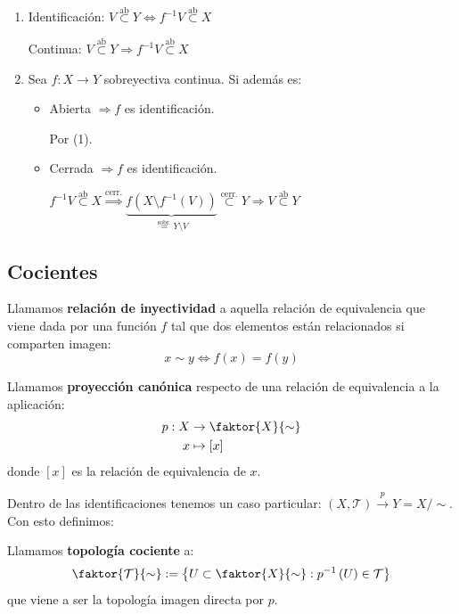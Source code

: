 \begin{obs}
\begin{enumerate}
    \item Identificación: $V \stackrel{\text{ab}}{\subset} Y \Leftrightarrow f^{-1}V \stackrel{\text{ab}}{\subset} X$

    Continua: $V \stackrel{\text{ab}}{\subset } Y \Rightarrow f^{-1}V \stackrel{\text{ab}}{\subset} X$

    \item Sea $f: X \rightarrow Y$ sobreyectiva continua. Si además es:
    \begin{itemize}
        \item Abierta $\Rightarrow f$ es identificación. 
        \begin{demo}
            Por (1).
        \end{demo}
        \item Cerrada $\Rightarrow f$ es identificación.
        \begin{demo}
            $f^{-1}V \stackrel{\text{ab}}{\subset} X \stackrel{\text{cerr.}}{\Rightarrow} \underbrace{f \left( X \setminus f^{-1}\left( V \right) \right)}_{\stackrel{\text{sobr.}}{=} Y\setminus V}  \stackrel{\text{cerr.}}{\subset} Y \Rightarrow V \stackrel{\text{ab}}{\subset} Y$
        \end{demo}
    \end{itemize}
\end{enumerate}
\end{obs}

\subsection{Cocientes}
\label{sub:cocientes}
\begin{defi}
Llamamos \textbf{relación de inyectividad} a aquella relación de equivalencia que viene dada por una función $f$ tal que dos elementos están relacionados si comparten imagen:
\[
x \sim y \Leftrightarrow f\left( x \right) = f\left( y \right)
\]
\end{defi}

\begin{defi}
Llamamos \textbf{proyección canónica} respecto de una relación de equivalencia a la aplicación:
\begin{align*}
    p: X &\rightarrow \faktor{X}{\sim}\\ 
    x &\mapsto \left[ x \right]
\end{align*}
donde $\left[ x \right]$ es la relación de equivalencia de $x$.
\end{defi}
Dentro de las identificaciones tenemos un caso particular: $\left( X, \mathcal{T} \right) \stackrel{p}{\rightarrow} Y = X / \sim$. Con esto definimos:
\begin{defi}
Llamamos \textbf{topología cociente} a: 
\[
    \faktor{\mathcal{T}}{\sim} := \left\{ U \subset \faktor{X}{\sim}: p ^{-1}\left( U \right) \in \mathcal{T} \right\}
\]
que viene a ser la topología imagen directa por $p$.
\end{defi}

